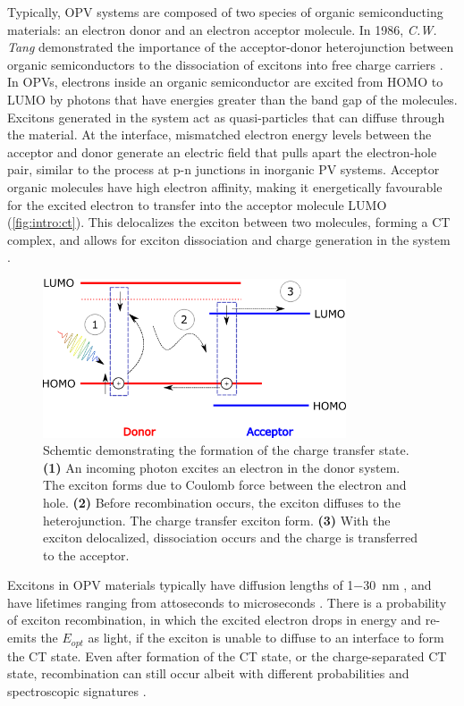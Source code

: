 Typically, \ac{OPV} systems are composed of two species of organic semiconducting materials: an electron donor and an electron acceptor molecule. In 1986, \textit{C.W. Tang} demonstrated the importance of the acceptor-donor heterojunction between organic semiconductors to the dissociation of excitons into free charge carriers \citep{tang1986two}. In \acp{OPV}, electrons inside an organic semiconductor are excited from \ac{HOMO} to \ac{LUMO} by photons that have energies greater than the band gap of the molecules. Excitons generated in the system act as quasi-particles that can diffuse through the material. At the interface, mismatched electron energy levels between the acceptor and donor generate an electric field that pulls apart the electron-hole pair, similar to the process at p-n junctions in inorganic PV systems. Acceptor organic molecules have high electron affinity, making it energetically favourable for the excited electron to transfer into the acceptor molecule \ac{LUMO} (\autoref{fig:intro:ct}). This delocalizes the exciton between two molecules, forming a \ac{CT} complex, and allows for exciton dissociation and charge generation in the system \citep{bernardo2014delocalization}.

\begin{figure}[h]
    \centering
    \includegraphics[width=0.8\textwidth]{pictures/CT_energy.png}
    \caption{Schemtic demonstrating the formation of the charge transfer state. \textbf{(1)} An incoming photon excites an electron in the donor system. The exciton forms due to Coulomb force between the electron and hole. \textbf{(2)} Before recombination occurs, the exciton diffuses to the heterojunction. The charge transfer exciton form. \textbf{(3)} With the exciton delocalized, dissociation occurs and the charge is transferred to the acceptor.}
    \label{fig:intro:ct}
\end{figure}

Excitons in \ac{OPV} materials typically have diffusion lengths of 1\SI{-30}{nm} \citep{proctor2013charge}, and have lifetimes ranging from attoseconds to microseconds \citep{tamai2015exciton}. There is a probability of exciton recombination, in which the excited electron drops in energy and re-emits the $E_{opt}$ as light, if the exciton is unable to diffuse to an interface to form the \ac{CT} state. Even after formation of the \ac{CT} state, or the charge-separated \ac{CT} state, recombination can still occur albeit with different probabilities and spectroscopic signatures \citep{deibel2010role}.

